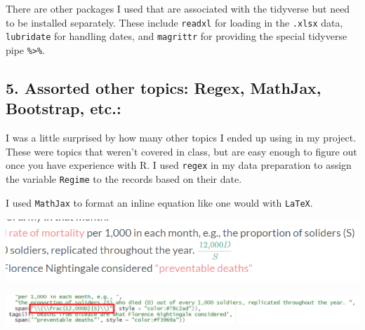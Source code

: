 \documentclass[
  dvipsnames]{article}
\newenvironment{Shaded}{\begin{snugshade}}{\end{snugshade}}
\newcommand{\AttributeTok}[1]{\textcolor[rgb]{0.77,0.63,0.00}{#1}}
\newcommand{\FunctionTok}[1]{\textcolor[rgb]{0.00,0.00,0.00}{#1}}
\newcommand{\NormalTok}[1]{#1}
\newcommand{\SpecialCharTok}[1]{\textcolor[rgb]{0.00,0.00,0.00}{#1}}
\newcommand{\StringTok}[1]{\textcolor[rgb]{0.31,0.60,0.02}{#1}}
\begin{document}
There are other packages I used that are associated with the tidyverse
but need to be installed separately. These include \texttt{readxl} for
loading in the \texttt{.xlsx} data, \texttt{lubridate} for handling
dates, and \texttt{magrittr} for providing the special tidyverse pipe
\texttt{\%\textgreater{}\%}.

\hypertarget{section-13}{%
\subsection{\texorpdfstring{\textcolor{TealBlue}{5. Assorted other topics: Regex, MathJax, Bootstrap, etc.:}}{}}\label{section-13}}

I was a little surprised by how many other topics I ended up using in my
project. These were topics that weren't covered in class, but are easy
enough to figure out once you have experience with R. I used
\texttt{regex} in my data preparation to assign the variable
\texttt{Regime} to the records based on their date.

\begin{Shaded}
\end{Shaded}

I used \texttt{MathJax} to format an inline equation like one would with
\texttt{LaTeX}.

\begin{center}\includegraphics[width=0.9\linewidth]{mathjax_display} \end{center}

\begin{center}\includegraphics[width=0.9\linewidth]{mathjax_code} \end{center}
\end{document}
